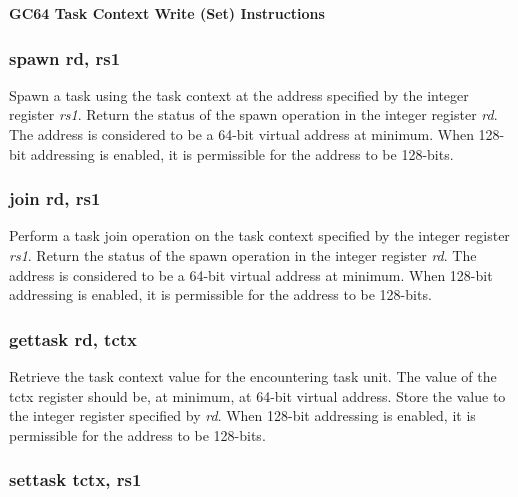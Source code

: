 \documentclass{article}
\begin{document}
\begin{center}
\textbf{GC64 Task Context Write (Set) Instructions}
\makebox[0.03in][s]{}\makebox[0.03in][s]{}\makebox[0.03in][s]{}\makebox[0.03in][s]{}\makebox[0.03in][s]{}
\end{center}

\subsubsection{spawn rd, rs1}

Spawn a task using the task context at the address specified by the integer 
register \emph{rs1}.  Return the status of the spawn operation in the 
integer register \emph{rd}.  The address is considered to be a 64-bit virtual 
address at minimum.  When 128-bit addressing is enabled, it is permissible 
for the address to be 128-bits.  

\subsubsection{join rd, rs1}

Perform a task join operation on the task context specified 
by the integer register \emph{rs1}.  Return the status of the spawn operation
in the integer register \emph{rd}.  The address is considered to be a
64-bit virtual address at minimum.  When 128-bit addressing is enabled, it is
permissible for the address to be 128-bits. 

\subsubsection{gettask rd, tctx}

Retrieve the task context value for the encountering task unit.  
The value of the tctx register should be, at minimum, at 64-bit virtual
address.  Store the value to the integer register specified by \emph{rd}.  
When 128-bit addressing is enabled, it is permissible for the address to be 128-bits.

\subsubsection{settask tctx, rs1}
\end{document}
